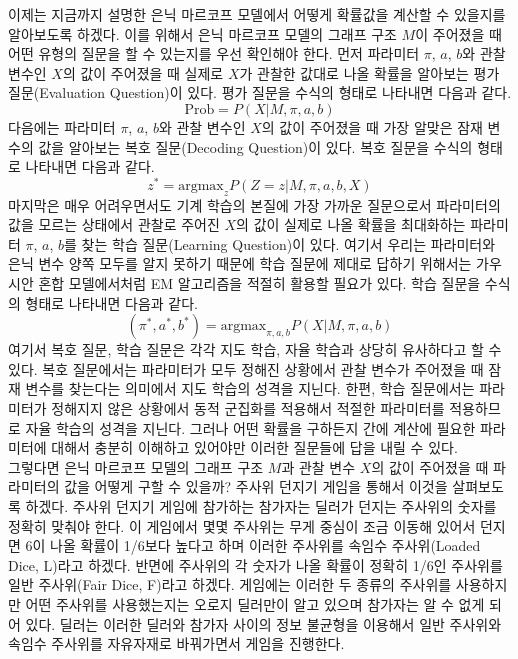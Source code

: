 \documentclass[a4paper]{oblivoir}
\begin{document}
이제는 지금까지 설명한 은닉 마르코프 모델에서 어떻게 확률값을 계산할 수 있을지를 알아보도록 하겠다. 이를 위해서 은닉 마르코프 모델의 그래프 구조 $M$이 주어졌을 때 어떤 유형의 질문을 할 수 있는지를 우선 확인해야 한다. 먼저 파라미터 $\pi$, $a$, $b$와 관찰 변수인 $X$의 값이 주어졌을 때 실제로 $X$가 관찰한 값대로 나올 확률을 알아보는 평가 질문(Evaluation Question)이 있다. 평가 질문을 수식의 형태로 나타내면 다음과 같다.
\begin{equation}
\textrm{Prob} = P(X|M, \pi, a, b)
\label{eq:9-3}
\end{equation}
다음에는 파라미터 $\pi$, $a$, $b$와 관찰 변수인 $X$의 값이 주어졌을 때 가장 알맞은 잠재 변수의 값을 알아보는 복호 질문(Decoding Question)이 있다. 복호 질문을 수식의 형태로 나타내면 다음과 같다. 
\begin{equation}
z^{*} = \textrm{argmax}_{z} P(Z=z|M, \pi, a, b, X)
\label{eq:9-4}
\end{equation}
마지막은 매우 어려우면서도 기계 학습의 본질에 가장 가까운 질문으로서 파라미터의 값을 모르는 상태에서 관찰로 주어진 $X$의 값이 실제로 나올 확률을 최대화하는 파라미터 $\pi$, $a$, $b$를 찾는 학습 질문(Learning Question)이 있다. 여기서 우리는 파라미터와 은닉 변수 양쪽 모두를 알지 못하기 때문에 학습 질문에 제대로 답하기 위해서는 가우시안 혼합 모델에서처럼 EM 알고리즘을 적절히 활용할 필요가 있다. 학습 질문을 수식의 형태로 나타내면 다음과 같다. 
\begin{equation}
(\pi^{*}, a^{*}, b^{*}) = \textrm{argmax}_{\pi, a, b} P(X|M, \pi, a, b)
\label{eq:9-5}
\end{equation}
여기서 복호 질문, 학습 질문은 각각 지도 학습, 자율 학습과 상당히 유사하다고 할 수 있다. 복호 질문에서는 파라미터가 모두 정해진 상황에서 관찰 변수가 주어졌을 때 잠재 변수를 찾는다는 의미에서 지도 학습의 성격을 지닌다. 한편, 학습 질문에서는 파라미터가 정해지지 않은 상황에서 동적 군집화를 적용해서 적절한 파라미터를 적용하므로 자율 학습의 성격을 지닌다. 그러나 어떤 확률을 구하든지 간에 계산에 필요한 파라미터에 대해서 충분히 이해하고 있어야만 이러한 질문들에 답을 내릴 수 있다. \\  

그렇다면 은닉 마르코프 모델의 그래프 구조 $M$과 관찰 변수 $X$의 값이 주어졌을 때 파라미터의 값을 어떻게 구할 수 있을까? 주사위 던지기 게임을 통해서 이것을 살펴보도록 하겠다. 주사위 던지기 게임에 참가하는 참가자는 딜러가 던지는 주사위의 숫자를 정확히 맞춰야 한다. 이 게임에서 몇몇 주사위는 무게 중심이 조금 이동해 있어서 던지면 6이 나올 확률이 1/6보다 높다고 하며 이러한 주사위를 속임수 주사위(Loaded Dice, L)라고 하겠다. 반면에 주사위의 각 숫자가 나올 확률이 정확히 1/6인 주사위를 일반 주사위(Fair Dice, F)라고 하겠다. 게임에는 이러한 두 종류의 주사위를 사용하지만 어떤 주사위를 사용했는지는 오로지 딜러만이 알고 있으며 참가자는 알 수 없게 되어 있다. 딜러는 이러한 딜러와 참가자 사이의 정보 불균형을 이용해서 일반 주사위와 속임수 주사위를 자유자재로 바꿔가면서 게임을 진행한다. \\
\end{document}
